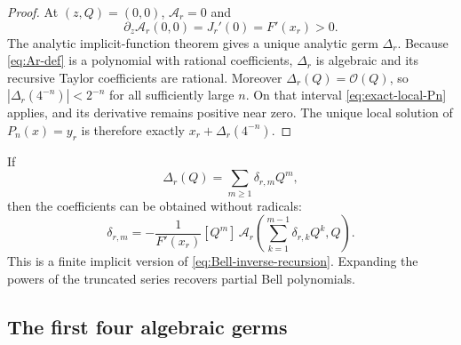 \documentclass[11pt,oneside]{article}
\numberwithin{equation}{section}
\theoremstyle{definition}
\theoremstyle{remark}
\newcommand{\bigO}{\mathcal O}
\begin{document}
\begin{proof}
At $(z,Q)=(0,0)$, $\mathcal A_r=0$ and
\[
 \partial_z\mathcal A_r(0,0)=J_r'(0)=F'(x_r)>0.
\]
The analytic implicit-function theorem gives a unique analytic germ $\Delta_r$.
Because \eqref{eq:Ar-def} is a polynomial with rational coefficients,
$\Delta_r$ is algebraic and its recursive Taylor coefficients are rational.
Moreover $\Delta_r(Q)=\bigO(Q)$, so
$|\Delta_r(4^{-n})|<2^{-n}$ for all sufficiently large $n$.  On that interval
\eqref{eq:exact-local-Pn} applies, and its derivative remains positive near zero.
The unique local solution of $P_n(x)=y_r$ is therefore exactly
$x_r+\Delta_r(4^{-n})$.
\end{proof}

If
\begin{equation}
 \Delta_r(Q)=\sum_{m\ge1}\delta_{r,m}Q^m,
 \label{eq:Delta-series}
\end{equation}
then the coefficients can be obtained without radicals:
\begin{equation}
 \boxed{
 \delta_{r,m}=-\frac1{F'(x_r)}[Q^m]\,
 \mathcal A_r\!\left(\sum_{k=1}^{m-1}\delta_{r,k}Q^k,Q\right).}
 \label{eq:Delta-recursion}
\end{equation}
This is a finite implicit version of \eqref{eq:Bell-inverse-recursion}.  Expanding the
powers of the truncated series recovers partial Bell polynomials.

\subsection{The first four algebraic germs}
\end{document}

